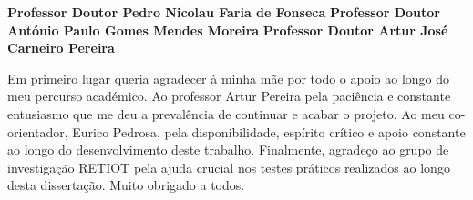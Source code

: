 \TitlePage
  \vspace*{55mm}
       {}
       {\textbf{Professor Doutor Pedro Nicolau Faria de Fonseca}}
  \vspace*{5mm}
       {\textbf{Professor Doutor Ant\'onio Paulo Gomes Mendes Moreira}}
  \vspace*{5mm}
  \TEXT{}
       {\textbf{Professor Doutor Artur Jos\'e Carneiro Pereira}}
\EndTitlePage
\titlepage\ \endtitlepage %

\TitlePage
  \vspace*{55mm}
       {Em primeiro lugar queria agradecer à minha mãe por todo o apoio ao
        longo do meu percurso académico. Ao professor Artur Pereira pela paciência e constante entusiasmo que me deu a prevalência de continuar e acabar o projeto.
     Ao meu co-orientador, Eurico Pedrosa, pela disponibilidade, espírito
crítico e apoio constante ao longo do desenvolvimento deste trabalho.
Finalmente, agradeço ao grupo de investigação RETIOT pela ajuda
crucial nos testes práticos realizados ao longo desta dissertação.
Muito obrigado a todos.
       }
  \TEXT{}
       {%
       }

